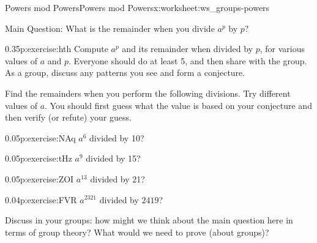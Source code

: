 \documentclass[11pt]{book}
\begin{document}
%
%
\typeout{************************************************}
\typeout{************************************************}
%
\begin{worksheet-subsection}{Powers mod Powers}{}{Powers mod Powers}{}{}{x:worksheet:ws_groups-powers}
\begin{introduction}{}%
Main Question: What is the remainder when you divide \(a^p\) by \(p\)?%
\end{introduction}%
\begin{divisionexercise}{1}{}{0.35}{p:exercise:hth}%
Compute \(a^p\) and its remainder when divided by \(p\), for various values of \(a\) and \(p\).  Everyone should do at least 5, and then share with the group.  As a group, discuss any patterns you see and form a conjecture.%
\end{divisionexercise}%
Find the remainders when you perform the following divisions.  Try different values of \(a\).  You should first guess what the value is based on your conjecture and then verify (or refute) your guess.%
\begin{divisionexercise}{2}{}{0.05}{p:exercise:NAq}%
\(a^6\) divided by 10?%
\end{divisionexercise}%
\begin{divisionexercise}{3}{}{0.05}{p:exercise:tHz}%
\(a^9\) divided by 15?%
\end{divisionexercise}%
\begin{divisionexercise}{4}{}{0.05}{p:exercise:ZOI}%
\(a^{13}\) divided by 21?%
\end{divisionexercise}%
\begin{divisionexercise}{5}{}{0.04}{p:exercise:FVR}%
\(a^{2321}\) divided by \(2419\)?%
\end{divisionexercise}%
Discuss in your groups: how might we think about the main question here in terms of group theory?  What would we need to prove (about groups)?%
\end{worksheet-subsection}
\restoregeometry
\end{document}
